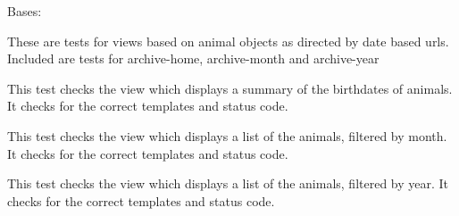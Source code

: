 \documentclass[letterpaper,10pt,english]{sphinxmanual}
\begin{document}
\begin{fulllineitems}
\label{api:animal.tests.DateViewTests}
Bases: 

These are tests for views based on animal objects as directed by date based urls.  Included are tests for archive-home, archive-month and archive-year


\begin{fulllineitems}
\label{api:animal.tests.DateViewTests.setUp}
\end{fulllineitems}



\begin{fulllineitems}
\label{api:animal.tests.DateViewTests.tearDown}
\end{fulllineitems}



\begin{fulllineitems}
\label{api:animal.tests.DateViewTests.test_archive_home}
This test checks the view which displays a summary of the birthdates of animals.  It checks for the correct templates and status code.

\end{fulllineitems}



\begin{fulllineitems}
\label{api:animal.tests.DateViewTests.test_archive_month}
This test checks the view which displays a list of the animals, filtered by month.  It checks for the correct templates and status code.

\end{fulllineitems}



\begin{fulllineitems}
\label{api:animal.tests.DateViewTests.test_archive_year}
This test checks the view which displays a list of the animals, filtered by year.  It checks for the correct templates and status code.

\end{fulllineitems}


\end{fulllineitems}
\end{document}
